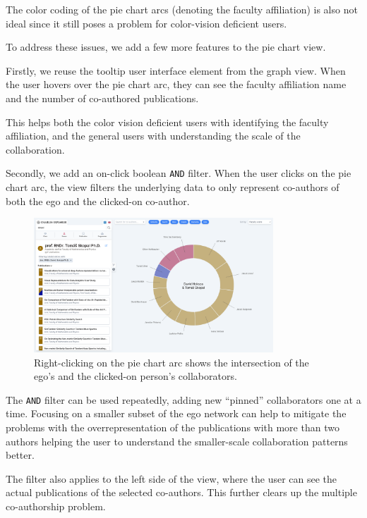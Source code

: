 The color coding of the pie chart arcs (denoting the faculty affiliation) is also not ideal since it still poses a problem for color-vision deficient users.

To address these issues, we add a few more features to the pie chart view.

Firstly, we reuse the tooltip user interface element from the graph view. 
When the user hovers over the pie chart arc, they can see the faculty affiliation name and the number of co-authored publications.

This helps both the color vision deficient users with identifying the faculty affiliation, and the general users with understanding the scale of the collaboration.

Secondly, we add an on-click boolean \texttt{AND} filter. 
When the user clicks on the pie chart arc, the view filters the underlying data to only represent co-authors of both the ego and the clicked-on co-author.

\begin{figure}[ht!]
    \captionsetup{width=.9\linewidth}
    \includegraphics[width=0.8\textwidth]{../img/pie-chart-filter.png}
    \centering
    \caption{Right-clicking on the pie chart arc shows the intersection of the ego's and the clicked-on person's collaborators.}
\end{figure}

The \texttt{AND} filter can be used repeatedly, adding new ``pinned'' collaborators one at a time.
Focusing on a smaller subset of the ego network can help to mitigate the problems with the overrepresentation of the publications with more than two authors
helping the user to understand the smaller-scale collaboration patterns better.

The filter also applies to the left side of the view, where the user can see the actual publications of the selected co-authors.
This further clears up the multiple co-authorship problem.

